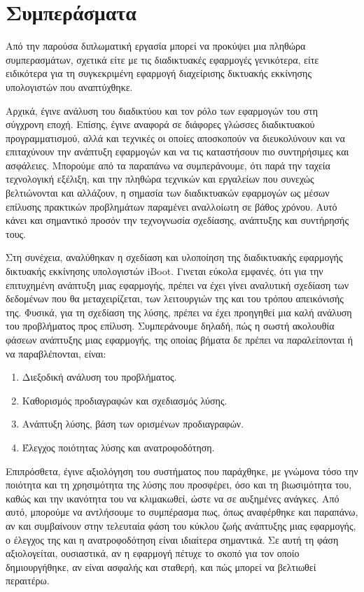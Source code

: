 \section{Συμπεράσματα}
Από την παρούσα διπλωματική εργασία μπορεί να προκύψει μια πληθώρα συμπερασμάτων, σχετικά είτε με τις διαδικτυακές εφαρμογές γενικότερα, είτε ειδικότερα για τη συγκεκριμένη εφαρμογή διαχείρισης δικτυακής εκκίνησης υπολογιστών που αναπτύχθηκε.

Αρχικά, έγινε ανάλυση του διαδικτύου και τον ρόλο των εφαρμογών του στη σύγχρονη εποχή. Επίσης, έγινε αναφορά σε διάφορες γλώσσες διαδικτυακού προγραμματισμού, αλλά και τεχνικές οι οποίες αποσκοπούν να διευκολύνουν και να επιταχύνουν την ανάπτυξη εφαρμογών και να τις καταστήσουν πιο συντηρήσιμες και ασφάλειες. Μπορούμε από τα παραπάνω να συμπεράνουμε, ότι παρά την ταχεία τεχνολογική εξέλιξη, και την πληθώρα τεχνικών και εργαλείων που συνεχώς βελτιώνονται και αλλάζουν, η σημασία των διαδικτυακών εφαρμογών ως μέσων επίλυσης πρακτικών προβλημάτων παραμένει αναλλοίωτη σε βάθος χρόνου. Αυτό κάνει και σημαντικό προσόν την τεχνογνωσία σχεδίασης, ανάπτυξης και συντήρησής τους.

Στη συνέχεια, αναλύθηκαν η σχεδίαση και υλοποίηση της διαδικτυακής εφαρμογής δικτυακής εκκίνησης υπολογιστών iBoot. Γινεται εύκολα εμφανές, ότι για την επιτυχημένη ανάπτυξη μιας εφαρμογής, πρέπει να έχει γίνει αναλυτική σχεδίαση των δεδομένων που θα μεταχειρίζεται, των λειτουργιών της και του τρόπου απεικόνισής της. Φυσικά, για τη σχεδίαση της λύσης, πρέπει να έχει προηγηθεί μια καλή ανάλυση του προβλήματος προς επίλυση. Συμπεράνουμε δηλαδή, πώς η σωστή ακολουθία φάσεων ανάπτυξης μιας εφαρμογής, της οποίας βήματα δε πρέπει να παραλείπονται ή να παραβλέπονται, είναι:
\begin{enumerate}
	\item Διεξοδική ανάλυση του προβλήματος.
	\item Καθορισμός προδιαγραφών και σχεδιασμός λύσης.
	\item Ανάπτυξη λύσης, βάση των ορισμένων προδιαγραφών.
	\item Έλεγχος ποιότητας λύσης και ανατροφοδότηση.
\end{enumerate}

Επιπρόσθετα, έγινε αξιολόγηση του συστήματος που παράχθηκε, με γνώμονα τόσο την ποιότητα και τη χρησιμότητα της λύσης που προσφέρει, όσο και τη βιωσιμότητα του, καθώς και την ικανότητα του να κλιμακωθεί, ώστε να σε αυξημένες ανάγκες. Από αυτό, μπορούμε να αντλήσουμε το συμπέρασμα πως, όπως αναφέρθηκε και παραπάνω, αν και συμβαίνουν στην τελευταία φάση του κύκλου ζωής ανάπτυξης μιας εφαρμογής, ο έλεγχος της και η ανατροφοδότηση είναι ιδιαίτερα σημαντικά. Σε αυτή τη φάση αξιολογείται, ουσιαστικά, αν η εφαρμογή πέτυχε το σκοπό για τον οποίο δημιουργήθηκε, αν είναι ασφαλής και σταθερή, και πώς μπορεί να βελτιωθεί περαιτέρω.

